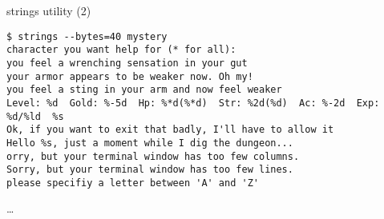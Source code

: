 \begin{frame}[fragile]{strings utility (2)}
\begin{Verbatim}[fontsize=\fontsize{9}{10}]
$ strings --bytes=40 mystery
character you want help for (* for all):
you feel a wrenching sensation in your gut
your armor appears to be weaker now. Oh my!
you feel a sting in your arm and now feel weaker
Level: %d  Gold: %-5d  Hp: %*d(%*d)  Str: %2d(%d)  Ac: %-2d  Exp: %d/%ld  %s
Ok, if you want to exit that badly, I'll have to allow it
Hello %s, just a moment while I dig the dungeon...
orry, but your terminal window has too few columns.
Sorry, but your terminal window has too few lines.
please specifiy a letter between 'A' and 'Z'
\end{Verbatim}
\ldots
\end{frame}
